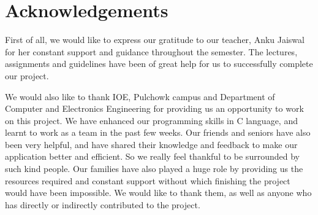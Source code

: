 \documentclass[report]{subfiles}
\begin{document}
\chapter*{\centering Acknowledgements}

First of all, we would like to express our gratitude to our teacher, Anku Jaiswal for her constant support and guidance throughout the semester.
The lectures, assignments and guidelines have been of great help for us to successfully complete our project.

We would also like to thank IOE, Pulchowk campus and Department of Computer and Electronics Engineering for providing us an opportunity to work on this project.
We have enhanced our programming skills in C language, and learnt to work as a team in the past few weeks. Our friends and seniors have also been very helpful, and have shared their knowledge and feedback to make our application better and efficient.
So we really feel thankful to be surrounded by such kind people. Our families have also played a huge role by providing us the resources required and constant support without which finishing the project would have been impossible.
We would like to thank them, as well as anyone who has directly or indirectly contributed to the project.
\end{document}
